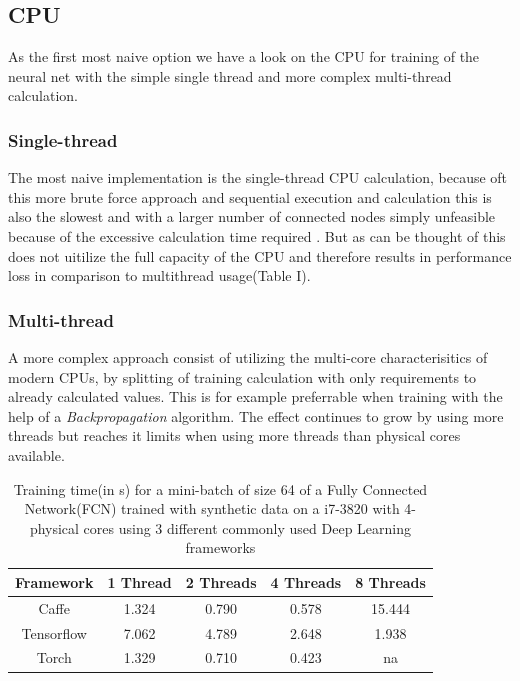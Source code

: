 \documentclass[conference]{IEEEtran}
\begin{document}
\subsection{CPU}
As the first most naive option we have a look on the CPU for training of the neural net with the simple single thread and more complex multi-thread calculation.


\subsubsection{Single-thread}
The most naive implementation is the single-thread CPU calculation, because oft this more  brute force approach and sequential execution and calculation this is also the slowest and with a larger number of connected nodes simply unfeasible because of the excessive calculation time required . But as can be thought of this does not uitilize the full capacity of the CPU and therefore results in performance loss in comparison to multithread usage(Table I).


\subsubsection{Multi-thread}
A more complex approach consist of utilizing the multi-core characterisitics of modern CPUs, by splitting of training calculation with only requirements to already calculated values. This is for example preferrable when training with the help of a \emph{Backpropagation} algorithm. The effect  continues to grow by using more threads but reaches it limits when using more threads than physical cores available.

\begin{table} 
\centering
\begin{tabular}{c c c c c}
\hline
Framework & 1 Thread & 2 Threads &4 Threads & 8 Threads\\\hline
Caffe & 1.324 & 0.790 & 0.578 & 15.444 \\
Tensorflow & 7.062 & 4.789 & 2.648 & 1.938 \\
Torch & 1.329 & 0.710 & 0.423 & na \\\hline
\end{tabular}
\caption{Training time(in s) for a mini-batch of size 64 of a Fully Connected Network(FCN) trained with synthetic data on a i7-3820 with 4-physical cores using 3 different commonly used Deep Learning frameworks\cite{shi2016benchmarking}}
\label{fig_ttfcn}
\end{table}
\end{document}
